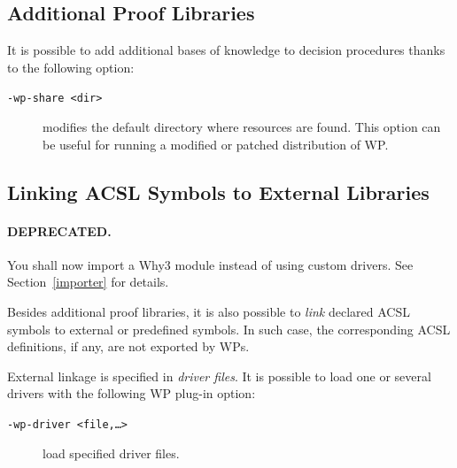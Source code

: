 \subsection{Additional Proof Libraries}
\label{prooflibs}

It is possible to add additional bases of knowledge to decision
procedures thanks to the following option:
\begin{description}
\item[\tt -wp-share <dir>] modifies the default directory where
  resources are found.  This option can be useful for running a modified or
  patched distribution of \textsf{WP}.
\end{description}

\subsection{Linking \textsf{ACSL} Symbols to External Libraries}
\label{drivers}

\paragraph{DEPRECATED.} You shall now import a Why3 module
instead of using custom drivers. See Section~\ref{importer} for details.

Besides additional proof libraries, it is also possible to
\emph{link} declared \textsf{ACSL} symbols to external or predefined
symbols. In such case, the corresponding \textsf{ACSL} definitions,
if any, are not exported by \textsf{WP}s.

External linkage is specified in \emph{driver files}. It is possible
to load one or several drivers with the following \textsf{WP} plug-in option:
\begin{description}
\item[\tt -wp-driver <file,\ldots>] load specified driver files.
\end{description}

